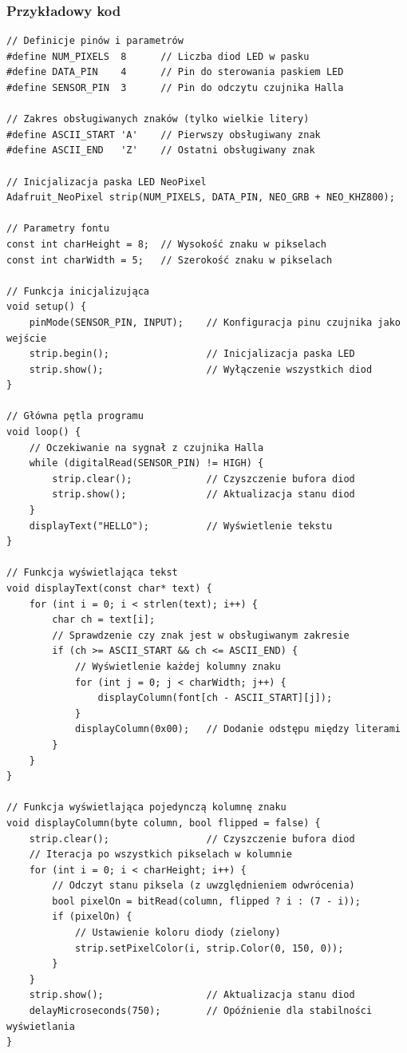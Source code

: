 \documentclass{article}
\begin{document}
\subsubsection{Przykładowy kod}
\begin{verbatim}
// Definicje pinów i parametrów
#define NUM_PIXELS  8      // Liczba diod LED w pasku
#define DATA_PIN    4      // Pin do sterowania paskiem LED
#define SENSOR_PIN  3      // Pin do odczytu czujnika Halla

// Zakres obsługiwanych znaków (tylko wielkie litery)
#define ASCII_START 'A'    // Pierwszy obsługiwany znak
#define ASCII_END   'Z'    // Ostatni obsługiwany znak

// Inicjalizacja paska LED NeoPixel
Adafruit_NeoPixel strip(NUM_PIXELS, DATA_PIN, NEO_GRB + NEO_KHZ800);

// Parametry fontu
const int charHeight = 8;  // Wysokość znaku w pikselach
const int charWidth = 5;   // Szerokość znaku w pikselach

// Funkcja inicjalizująca
void setup() {
    pinMode(SENSOR_PIN, INPUT);    // Konfiguracja pinu czujnika jako wejście
    strip.begin();                 // Inicjalizacja paska LED
    strip.show();                  // Wyłączenie wszystkich diod
}

// Główna pętla programu
void loop() {
    // Oczekiwanie na sygnał z czujnika Halla
    while (digitalRead(SENSOR_PIN) != HIGH) {
        strip.clear();             // Czyszczenie bufora diod
        strip.show();              // Aktualizacja stanu diod
    }
    displayText("HELLO");          // Wyświetlenie tekstu
}

// Funkcja wyświetlająca tekst
void displayText(const char* text) {
    for (int i = 0; i < strlen(text); i++) {
        char ch = text[i];
        // Sprawdzenie czy znak jest w obsługiwanym zakresie
        if (ch >= ASCII_START && ch <= ASCII_END) {
            // Wyświetlenie każdej kolumny znaku
            for (int j = 0; j < charWidth; j++) {
                displayColumn(font[ch - ASCII_START][j]);
            }
            displayColumn(0x00);   // Dodanie odstępu między literami
        }
    }
}

// Funkcja wyświetlająca pojedynczą kolumnę znaku
void displayColumn(byte column, bool flipped = false) {
    strip.clear();                 // Czyszczenie bufora diod
    // Iteracja po wszystkich pikselach w kolumnie
    for (int i = 0; i < charHeight; i++) {
        // Odczyt stanu piksela (z uwzględnieniem odwrócenia)
        bool pixelOn = bitRead(column, flipped ? i : (7 - i));
        if (pixelOn) {
            // Ustawienie koloru diody (zielony)
            strip.setPixelColor(i, strip.Color(0, 150, 0));
        }
    }
    strip.show();                  // Aktualizacja stanu diod
    delayMicroseconds(750);        // Opóźnienie dla stabilności wyświetlania
}
\end{verbatim}
\end{document}
